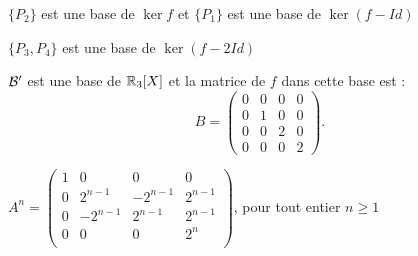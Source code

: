 \begin{multi}
    \item \(\{P_2\}\) est une base de \(\ker f\) et \(\{P_1\}\) est une base de \(\ker (f-Id)\)
    \item* \(\{P_3,P_4\}\) est une base de \(\ker (f-2Id)\)
    \item* \({\cal B}'\) est une base de \(\mathbb{R}_3[X]\) et la matrice de \(f\) dans cette base est :
\[B= \left(\begin{array}{rccc}0&0&0&0\\
0&1&0&0\\ 0&0&2&0\\0&0&0&2\end{array}\right).\]
    \item* \(A^n=\left(\begin{array}{rccc}
1&0&0&0\\
0 &2^{n-1}&-2^{n-1}&2^{n-1}\\
0 &-2^{n-1}&2^{n-1}&2^{n-1}\\
0 &0&0&2^n\\
\end{array}\right)\),  pour tout entier \(n\ge1\)
\end{multi}
